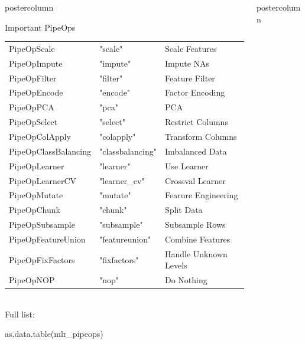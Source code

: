 \documentclass{beamer}
\newcommand{\codeinline}[1]{\begin{codeboxinline}#1\end{codeboxinline}}
\begin{document}
\begin{frame}[fragile]{}
\begin{columns}
\begin{column}{.245\textwidth}
\begin{beamercolorbox}[center]{postercolumn}
\begin{minipage}{.98\textwidth}
{\begin{myblock}{Important PipeOps}
\begin{footnotesize}
\begin{centering}
\begin{tabular}{l l l}
                    PipeOpScale & "scale" & Scale Features\\
                    PipeOpImpute & "impute" & Impute NAs\\
                    PipeOpFilter & "filter" & Feature Filter\\
                    PipeOpEncode & "encode" & Factor Encoding\\
                    PipeOpPCA & "pca" & PCA\\
                    PipeOpSelect & "select" & Restrict Columns\\ 
                    PipeOpColApply & "colapply" & Transform Columns\\ 
                    PipeOpClassBalancing & "classbalancing" & Imbalanced Data\\
                    PipeOpLearner & "learner" & Use Learner\\
                    PipeOpLearnerCV & "learner\_cv" & Crossval Learner\\
                    PipeOpMutate & "mutate" & Fearure Engineering\\ 
                    PipeOpChunk & "chunk" & Split Data\\ 
                    PipeOpSubsample & "subsample" & Subsample Rows\\ 
                    PipeOpFeatureUnion & "featureunion" & Combine Features\\ 
                    PipeOpFixFactors & "fixfactors" & Handle Unknown Levels\\
                    PipeOpNOP & "nop" & Do Nothing\\
                    \hline
                  \end{tabular}
                \end{centering}
              \end{footnotesize}
              \ \\
              Full list: \codeinline{as.data.table(mlr\_pipeops)}
						\end{myblock}
           	\vfill}
				\end{minipage}
			\end{beamercolorbox}
		\end{column}
		\begin{column}{.245\textwidth}
			\begin{beamercolorbox}[center]{postercolumn}
				\begin{minipage}{.98\textwidth}

\end{minipage}
\end{beamercolorbox}
\end{column}
\end{columns}
\end{frame}
\end{document}
